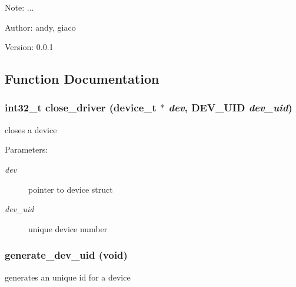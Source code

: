 \begin{Desc}
\item[Note:]... \end{Desc}
\begin{Desc}
\item[Author:]andy, giaco \end{Desc}
\begin{Desc}
\item[Version:]0.0.1 \end{Desc}


\subsection{Function Documentation}
\hypertarget{group__device__driver_g4915a14d06f79d1c5a2d72b186cee40d}{
\subsubsection[{close\_\-driver}]{\setlength{\rightskip}{0pt plus 5cm}int32\_\-t close\_\-driver (device\_\-t $\ast$ {\em dev}, \/  {\bf DEV\_\-UID} {\em dev\_\-uid})}}
\label{group__device__driver_g4915a14d06f79d1c5a2d72b186cee40d}


closes a device 

\begin{Desc}
\item[Parameters:]
\begin{description}
\item[{\em dev}]pointer to device struct \item[{\em dev\_\-uid}]unique device number \end{description}
\end{Desc}
\hypertarget{group__device__driver_g66f128d4bb74eca88758ca73f2fa4f9c}{
\subsubsection[{generate\_\-dev\_\-uid}]{ generate\_\-dev\_\-uid (void)}}
\label{group__device__driver_g66f128d4bb74eca88758ca73f2fa4f9c}


generates an unique id for a device 

